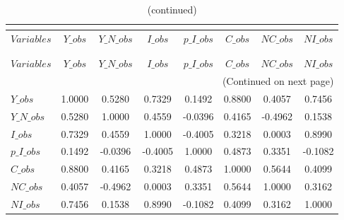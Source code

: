  
\begin{center}
\begin{longtable}{lccccccc} 
\caption{MATRIX OF CORRELATIONS}\\
 \label{Table:th_corr_matrix}\\
\toprule 
$Variables  $	 & 	 $      Y\_obs$	 & 	 $  Y\_N\_obs$	 & 	 $      I\_obs$	 & 	 $  p\_I\_obs$	 & 	 $      C\_obs$	 & 	 $     NC\_obs$	 & 	 $     NI\_obs$\\
\midrule \endfirsthead 
\caption{(continued)}\\
 \toprule \\ 
$Variables  $	 & 	 $      Y\_obs$	 & 	 $  Y\_N\_obs$	 & 	 $      I\_obs$	 & 	 $  p\_I\_obs$	 & 	 $      C\_obs$	 & 	 $     NC\_obs$	 & 	 $     NI\_obs$\\
\midrule \endhead 
\midrule \multicolumn{8}{r}{(Continued on next page)} \\ \bottomrule \endfoot 
\bottomrule \endlastfoot 
$Y\_obs     $	 & 	       1.0000	 & 	       0.5280	 & 	       0.7329	 & 	       0.1492	 & 	       0.8800	 & 	       0.4057	 & 	       0.7456 \\ 
$Y\_N\_obs  $	 & 	       0.5280	 & 	       1.0000	 & 	       0.4559	 & 	      -0.0396	 & 	       0.4165	 & 	      -0.4962	 & 	       0.1538 \\ 
$I\_obs     $	 & 	       0.7329	 & 	       0.4559	 & 	       1.0000	 & 	      -0.4005	 & 	       0.3218	 & 	       0.0003	 & 	       0.8990 \\ 
$p\_I\_obs  $	 & 	       0.1492	 & 	      -0.0396	 & 	      -0.4005	 & 	       1.0000	 & 	       0.4873	 & 	       0.3351	 & 	      -0.1082 \\ 
$C\_obs     $	 & 	       0.8800	 & 	       0.4165	 & 	       0.3218	 & 	       0.4873	 & 	       1.0000	 & 	       0.5644	 & 	       0.4099 \\ 
$NC\_obs    $	 & 	       0.4057	 & 	      -0.4962	 & 	       0.0003	 & 	       0.3351	 & 	       0.5644	 & 	       1.0000	 & 	       0.3162 \\ 
$NI\_obs    $	 & 	       0.7456	 & 	       0.1538	 & 	       0.8990	 & 	      -0.1082	 & 	       0.4099	 & 	       0.3162	 & 	       1.0000 \\ 
\end{longtable}
 \end{center}
